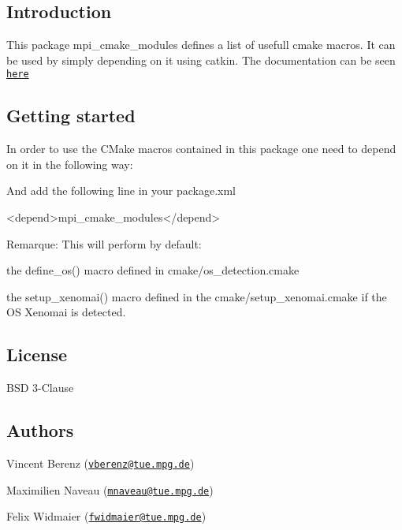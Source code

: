 \subsection*{Introduction}

This package {\ttfamily mpi\+\_\+cmake\+\_\+modules} defines a list of usefull cmake macros. It can be used by simply depending on it using catkin. The documentation can be seen \href{https://machines-in-motion.github.io/}{\tt here}

\subsection*{Getting started}

In order to use the C\+Make macros contained in this package one need to depend on it in the following way\+: 


And add the following line in your {\ttfamily package.\+xml}


\begin{DoxyCode}
<\textcolor{keywordtype}{depend}>\textcolor{keyword}{mpi\_cmake\_modules}</\textcolor{keywordtype}{depend}>
\end{DoxyCode}


Remarque\+: This will perform by default\+:
\begin{DoxyItemize}
\item the {\ttfamily define\+\_\+os()} macro defined in cmake/os\+\_\+detection.\+cmake
\item the {\ttfamily setup\+\_\+xenomai()} macro defined in the cmake/setup\+\_\+xenomai.\+cmake if the OS Xenomai is detected.
\end{DoxyItemize}

\subsection*{License}

B\+SD 3-\/\+Clause

\subsection*{Authors}


\begin{DoxyItemize}
\item Vincent Berenz (\href{mailto:vberenz@tue.mpg.de}{\tt vberenz@tue.\+mpg.\+de})
\item Maximilien Naveau (\href{mailto:mnaveau@tue.mpg.de}{\tt mnaveau@tue.\+mpg.\+de})
\item Felix Widmaier (\href{mailto:fwidmaier@tue.mpg.de}{\tt fwidmaier@tue.\+mpg.\+de}) 
\end{DoxyItemize}